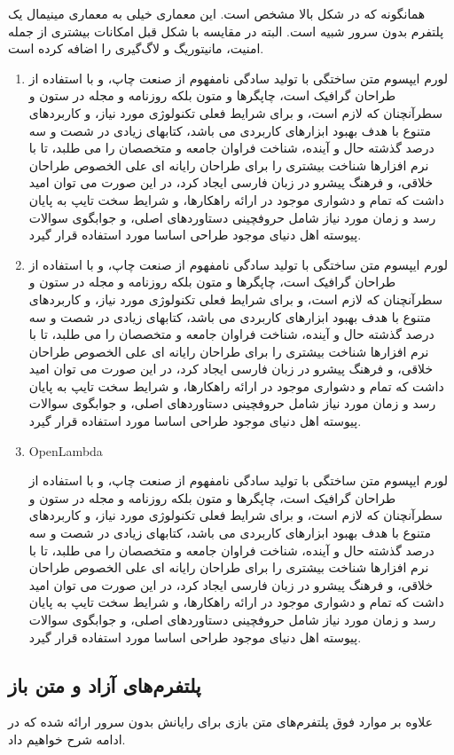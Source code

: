 همانگونه که در شکل بالا مشخص است. این معماری خیلی به معماری مینیمال یک پلتفرم بدون سرور شبیه است. البته در مقایسه با شکل قبل امکانات بیشتری از جمله امنیت، مانیتوریگ و لاگ‌گیری را اضافه کرده است. 

\begin{enumerate}
	\item {}
	
	لورم ایپسوم متن ساختگی با تولید سادگی نامفهوم از صنعت چاپ، و با استفاده از طراحان گرافیک است، چاپگرها و متون بلکه روزنامه و مجله در ستون و سطرآنچنان که لازم است، و برای شرایط فعلی تکنولوژی مورد نیاز، و کاربردهای متنوع با هدف بهبود ابزارهای کاربردی می باشد، کتابهای زیادی در شصت و سه درصد گذشته حال و آینده، شناخت فراوان جامعه و متخصصان را می طلبد، تا با نرم افزارها شناخت بیشتری را برای طراحان رایانه ای علی الخصوص طراحان خلاقی، و فرهنگ پیشرو در زبان فارسی ایجاد کرد، در این صورت می توان امید داشت که تمام و دشواری موجود در ارائه راهکارها، و شرایط سخت تایپ به پایان رسد و زمان مورد نیاز شامل حروفچینی دستاوردهای اصلی، و جوابگوی سوالات پیوسته اهل دنیای موجود طراحی اساسا مورد استفاده قرار گیرد.
	\item {}
	
	لورم ایپسوم متن ساختگی با تولید سادگی نامفهوم از صنعت چاپ، و با استفاده از طراحان گرافیک است، چاپگرها و متون بلکه روزنامه و مجله در ستون و سطرآنچنان که لازم است، و برای شرایط فعلی تکنولوژی مورد نیاز، و کاربردهای متنوع با هدف بهبود ابزارهای کاربردی می باشد، کتابهای زیادی در شصت و سه درصد گذشته حال و آینده، شناخت فراوان جامعه و متخصصان را می طلبد، تا با نرم افزارها شناخت بیشتری را برای طراحان رایانه ای علی الخصوص طراحان خلاقی، و فرهنگ پیشرو در زبان فارسی ایجاد کرد، در این صورت می توان امید داشت که تمام و دشواری موجود در ارائه راهکارها، و شرایط سخت تایپ به پایان رسد و زمان مورد نیاز شامل حروفچینی دستاوردهای اصلی، و جوابگوی سوالات پیوسته اهل دنیای موجود طراحی اساسا مورد استفاده قرار گیرد.
	
	\item {OpenLambda}
	
	لورم ایپسوم متن ساختگی با تولید سادگی نامفهوم از صنعت چاپ، و با استفاده از طراحان گرافیک است، چاپگرها و متون بلکه روزنامه و مجله در ستون و سطرآنچنان که لازم است، و برای شرایط فعلی تکنولوژی مورد نیاز، و کاربردهای متنوع با هدف بهبود ابزارهای کاربردی می باشد، کتابهای زیادی در شصت و سه درصد گذشته حال و آینده، شناخت فراوان جامعه و متخصصان را می طلبد، تا با نرم افزارها شناخت بیشتری را برای طراحان رایانه ای علی الخصوص طراحان خلاقی، و فرهنگ پیشرو در زبان فارسی ایجاد کرد، در این صورت می توان امید داشت که تمام و دشواری موجود در ارائه راهکارها، و شرایط سخت تایپ به پایان رسد و زمان مورد نیاز شامل حروفچینی دستاوردهای اصلی، و جوابگوی سوالات پیوسته اهل دنیای موجود طراحی اساسا مورد استفاده قرار گیرد.
	
\end{enumerate}

\subsection{پلتفرم‌های آزاد و متن باز}
علاوه بر موارد فوق پلتفرم‌های متن بازی برای رایانش بدون سرور ارائه شده که در ادامه شرح خواهیم داد. 

